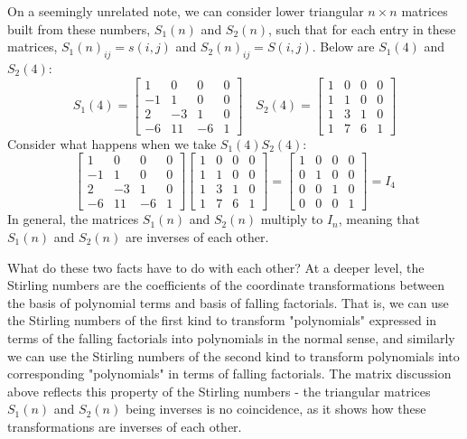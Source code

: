 \documentclass[11pt,twosided]{article}
\begin{document}
On a seemingly unrelated note, we can consider lower triangular $n\times n$ matrices built from these numbers, $S_1(n)$ and $S_2(n)$, such that for each entry in these matrices, $S_1(n)_{ij} = s(i, j)$ and $S_2(n)_{ij} = S(i, j)$. Below are $S_1(4)$ and $S_2(4)$: 
\[
	S_1(4) = \begin{bmatrix}
		1 & 0 & 0 & 0 \\
		-1 & 1 & 0 & 0 \\
		2 & -3 & 1 & 0 \\
		-6 & 11 & -6 & 1
	\end{bmatrix}	\quad 
	S_2(4) = \begin{bmatrix}
		1 & 0 & 0 & 0 \\
		1 & 1 & 0 & 0 \\
		1 & 3 & 1 & 0 \\
		1 & 7 & 6 & 1
	\end{bmatrix}	
\]
Consider what happens when we take $S_1(4)S_2(4)$: 
\[
\begin{bmatrix}
		1 & 0 & 0 & 0 \\
		-1 & 1 & 0 & 0 \\
		2 & -3 & 1 & 0 \\
		-6 & 11 & -6 & 1
	\end{bmatrix}	
	\begin{bmatrix}
		1 & 0 & 0 & 0 \\
		1 & 1 & 0 & 0 \\
		1 & 3 & 1 & 0 \\
		1 & 7 & 6 & 1
	\end{bmatrix}	=
	\begin{bmatrix}
		1 & 0 & 0 & 0 \\
		0 & 1 & 0 & 0 \\
		0 & 0 & 1 & 0 \\
		0 & 0 & 0 & 1
	\end{bmatrix} = I_4
\]
In general, the matrices $S_1(n)$ and $S_2(n)$ multiply to $I_n$, meaning that $S_1(n)$ and $S_2(n)$ are inverses of each other. 

What do these two facts have to do with each other? At a deeper level, the Stirling numbers are the coefficients of the coordinate transformations between the basis of polynomial terms and basis of falling factorials. That is, we can use the Stirling numbers of the first kind to transform "polynomials" expressed in terms of the falling factorials into polynomials in the normal sense, and similarly we can use the Stirling numbers of the second kind to transform polynomials into corresponding "polynomials" in terms of falling factorials. The matrix discussion above reflects this property of the Stirling numbers - the triangular matrices $S_1(n)$ and $S_2(n)$ being inverses is no coincidence, as it shows how these transformations are inverses of each other. 
\end{document}
